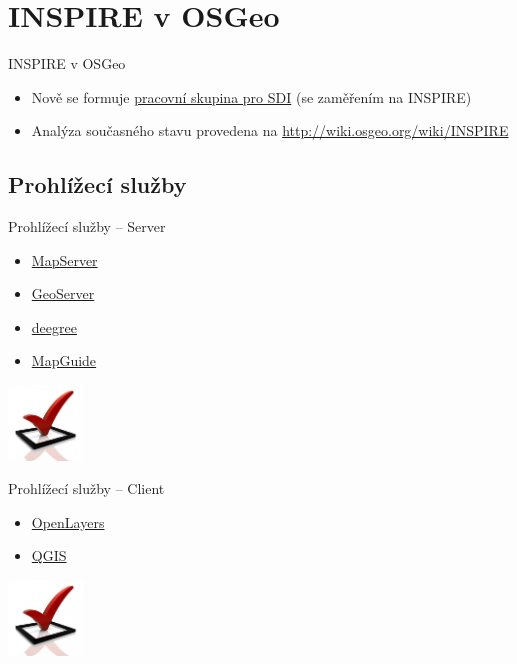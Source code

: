 \documentclass{beamer}
\begin{document}
\section{INSPIRE v OSGeo}

\begin{frame}{INSPIRE v OSGeo}
    \begin{itemize}
        \item Nově se formuje
            \href{http://wiki.osgeo.org/wiki/SDI_committee}{pracovní skupina pro
            SDI} (se zaměřením na INSPIRE)
        \item Analýza současného stavu provedena na
            \url{http://wiki.osgeo.org/wiki/INSPIRE} {\em } 
    \end{itemize}
\end{frame}

\subsection{Prohlížecí služby}
\begin{frame}{Prohlížecí služby -- Server}
    \begin{itemize}
        \item \href{http://mapserver.org}{MapServer}
        \item \href{http://geoserver.org}{GeoServer}
        \item \href{http://deegree.org}{deegree}
        \item \href{http://mapguide.osgeo.org}{MapGuide}
    \end{itemize}
    \begin{flushright} \includegraphics[width=2cm]{imgs/ils/done.jpg} \end{flushright} 
\end{frame}

\begin{frame}{Prohlížecí služby -- Client}
    \begin{itemize}
        \item \href{http://openlayers.org}{OpenLayers}
        \item \href{http://qgis.org}{QGIS}
    \end{itemize}
    \begin{flushright} \includegraphics[width=2cm]{imgs/ils/done.jpg} \end{flushright}
\end{frame}
\end{document}
